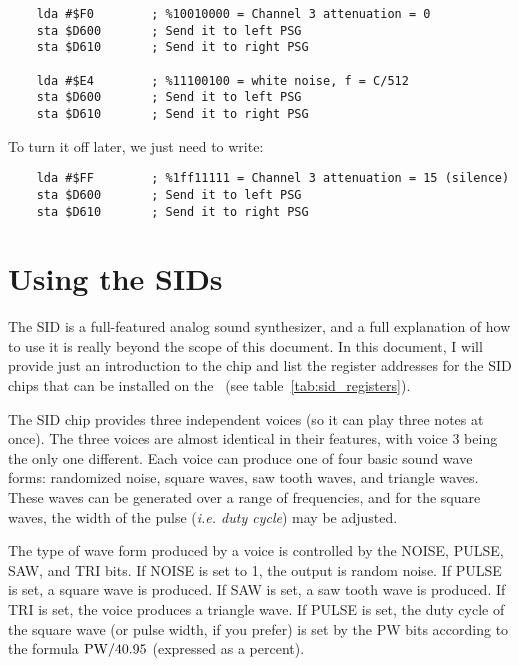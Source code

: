 \begin{verbatim}
    lda #$F0        ; %10010000 = Channel 3 attenuation = 0
    sta $D600       ; Send it to left PSG
    sta $D610       ; Send it to right PSG

    lda #$E4        ; %11100100 = white noise, f = C/512
    sta $D600       ; Send it to left PSG
    sta $D610       ; Send it to right PSG
\end{verbatim}
To turn it off later, we just need to write:

\begin{verbatim}
    lda #$FF        ; %1ff11111 = Channel 3 attenuation = 15 (silence)
    sta $D600       ; Send it to left PSG
    sta $D610       ; Send it to right PSG
\end{verbatim}

\section*{Using the SIDs}

The SID is a full-featured analog sound synthesizer, and a full explanation of how to use it is really beyond the scope of this document. In this document, I will provide just an introduction to the chip and list the register addresses for the SID chips that can be installed on the \jr\ (see table~\ref{tab:sid_registers}).

The SID chip provides three independent voices (so it can play three notes at once). The three voices are almost identical in their features, with voice 3 being the only one different. Each voice can produce one of four basic sound wave forms: randomized noise, square waves, saw tooth waves, and triangle waves. These waves can be generated over a range of frequencies, and for the square waves, the width of the pulse ({\it i.e. duty cycle}) may be adjusted.

The type of wave form produced by a voice is controlled by the NOISE, PULSE, SAW, and TRI bits. If NOISE is set to 1, the output is random noise. If PULSE is set, a square wave is produced. If SAW is set, a saw tooth wave is produced. If TRI is set, the voice produces a triangle wave. If PULSE is set, the duty cycle of the square wave (or pulse width, if you prefer) is set by the PW bits according to the formula
${\rm PW} / 40.95$ (expressed as a percent).

